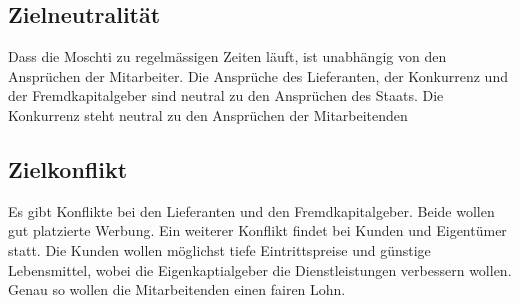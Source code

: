 \documentclass[a4paper, titlepage]{article}
\begin{document}
\subsection{Zielneutralität}
Dass die Moschti zu regelmässigen Zeiten läuft, ist unabhängig von den Ansprüchen der Mitarbeiter. 
Die Ansprüche des Lieferanten, der Konkurrenz und der Fremdkapitalgeber sind neutral zu den Ansprüchen des Staats.
Die Konkurrenz steht neutral zu den Ansprüchen der Mitarbeitenden
\subsection{Zielkonflikt}
Es gibt Konflikte bei den Lieferanten und den Fremdkapitalgeber. Beide wollen gut platzierte Werbung. 
Ein weiterer Konflikt findet bei Kunden und Eigentümer statt. Die Kunden wollen möglichst tiefe Eintrittspreise und günstige Lebensmittel, wobei die Eigenkaptialgeber die Dienstleistungen verbessern wollen.
Genau so wollen die Mitarbeitenden einen fairen Lohn.
\end{document}
